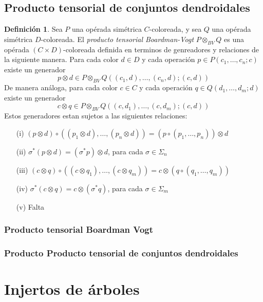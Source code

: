 \documentclass[11pt,a4paper,openright,oneside]{article}
\numberwithin{equation}{section}
\theoremstyle{definition}
\newtheorem{defi}[teo]{Definici\'on}
\begin{document}
\subsection{Producto tensorial de conjuntos dendroidales}
\begin{defi}
    Sea $P$ una op\'erada sim\'etrica $C$-coloreada, y sea $Q$ una op\'erada sim\'etrica $D$-coloreada. El \emph{producto tensorial Boardman-Vogt} $P\otimes_{BV}Q$ es una op\'erada $(C\times D)$-coloreada definida en terminos de genreadores y relaciones de la siguiente manera.
    Para cada color $d\in D$ y cada operaci\'on $p\in P(c_1,\dots,c_n;c)$ existe un generador
    $$
        p \otimes d \in P\otimes_{BV}Q((c_1,d),\dots,(c_n,d);(c,d))
    $$
    De manera an\'aloga, para cada color $c\in C$ y cada operaci\'on $q\in Q(d_1,\dots,d_m;d)$ existe un generador
    $$
        c \otimes q \in P\otimes_{BV}Q((c,d_1),\dots,(c,d_m);(c,d))
    $$
    Estos generadores estan sujetos a las siguientes relaciones:
    \begin{enumerate}
        \item[{\rm (i)}] $(p\otimes d) \circ ((p_1\otimes d),\dots,(p_n\otimes d)) = (p\circ(p_1,\dots,p_n))\otimes d$
        \item[{\rm (ii)}] $\sigma^{*}(p\otimes d) = (\sigma^{*}p)\otimes d$, para cada $\sigma\in\Sigma_n$
        \item[{\rm (iii)}] $(c\otimes q) \circ ((c\otimes q_1),\dots,(c\otimes q_m)) = c\otimes (q\circ(q_1,\dots,q_m))$
        \item[{\rm (iv)}] $\sigma^{*}(c\otimes q) = c\otimes (\sigma^{*}q)$, para cada $\sigma\in\Sigma_m$
        \item[{\rm (v)}] Falta
    \end{enumerate}
\end{defi}


\subsubsection{Producto tensorial Boardman Vogt}
\subsubsection{Producto Producto tensorial de conjuntos dendroidales}
\newpage


\section{Injertos de \'arboles}
\end{document}
